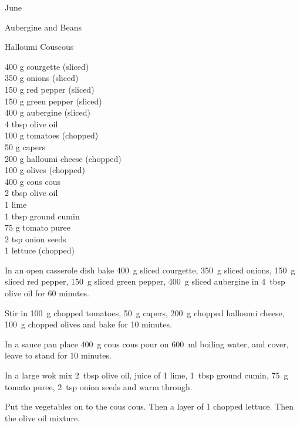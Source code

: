 \begin{menu}{June}
\begin{recipe}{2}{Aubergine and Beans}
\begin{instructions}
    \end{instructions}
    \end{recipe}%
  
    \begin{recipe}{2}{Halloumi Couscous}%
		\begin{ingredients}
		400 g courgette (sliced) \\
	350 g onions (sliced) \\
	150 g red pepper (sliced) \\
	150 g green pepper (sliced) \\
	400 g aubergine (sliced) \\
	4 tbsp olive oil  \\
	100 g tomatoes (chopped) \\
	50 g capers  \\
	200 g halloumi cheese (chopped) \\
	100 g olives (chopped) \\
	400 g cous cous  \\
	2 tbsp olive oil  \\
	1  lime  \\
	1 tbsp ground cumin  \\
	75 g tomato puree  \\
	2 tsp onion seeds  \\
	1  lettuce (chopped) \\
	
		\end{ingredients}
	
	
    \begin{instructions}
    \item 
        In an open casserole dish bake
        400~g sliced courgette,
        350~g sliced onions,
        150~g sliced red pepper,
        150~g sliced green pepper,
        400~g sliced aubergine
        in
        4~tbsp  olive oil
        for 60 minutes.
      \item 
        Stir in
        100~g chopped tomatoes,
        50~g  capers,
        200~g chopped halloumi cheese,
        100~g chopped olives
        and bake for 10 minutes.
      \item 
    In a
    sauce pan 
    place
    400~g  cous cous
    pour on
    600~ml  boiling water,
    and cover, leave to stand for 10 minutes.
  \item 
        In a large wok mix
        2~tbsp  olive oil,
        juice of
        1  lime,
        1~tbsp  ground cumin,
        75~g  tomato puree,
        2~tsp  onion seeds
        and warm through.
      \item 
        Put the vegetables on to the cous cous.
        Then a layer of
        1 chopped lettuce.
        Then the olive oil mixture.
      

\end{instructions}
\end{recipe}
\end{menu}
